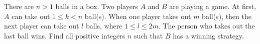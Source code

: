\problem
There are $n > 1$ balls in a box.
Two players $A$ and $B$ are playing a game.
At first, $A$ can take out $1 \leq k < n$ ball(s).
When one player takes out $m$ ball(s), then the next player can take out
$l$ balls, where $1 \leq l \leq 2 m$.
The person who takes out the last ball wins.
Find all positive integers $n$ such that $B$ has a winning strategy.
\solution
\endproblem
